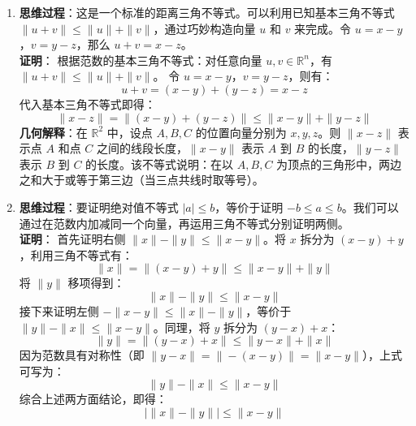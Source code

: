 \documentclass[lang=cn,11pt]{elegantbook}
\begin{document}
\begin{solution}
\begin{enumerate}
  \item[(1)] \textbf{思维过程}：这是一个标准的距离三角不等式。可以利用已知基本三角不等式 $\|u+v\| \leqslant  \|u\| + \|v\|$，通过巧妙构造向量 $u$ 和 $v$ 来完成。令 $u = x-y$，$v = y-z$，那么 $u+v = x-z$。\\
  \textbf{证明}：
  根据范数的基本三角不等式：对任意向量 $u, v \in \mathbb{R}^n$，有 $\|u+v\| \leqslant  \|u\| + \|v\|$。
  令 $u = x-y$，$v = y-z$，则有：
  \[
  u + v = (x-y) + (y-z) = x-z
  \]
  代入基本三角不等式即得：
  \[
  \|x-z\| = \|(x-y) + (y-z)\| \leqslant  \|x-y\| + \|y-z\|
  \]
  \textbf{几何解释}：在 $\mathbb{R}^2$ 中，设点 $A, B, C$ 的位置向量分别为 $x, y, z$。则 $\|x-z\|$ 表示点 $A$ 和点 $C$ 之间的线段长度，$\|x-y\|$ 表示 $A$ 到 $B$ 的长度，$\|y-z\|$ 表示 $B$ 到 $C$ 的长度。该不等式说明：在以 $A, B, C$ 为顶点的三角形中，两边之和大于或等于第三边（当三点共线时取等号）。

  \item[(2)] \textbf{思维过程}：要证明绝对值不等式 $|a| \leqslant  b$，等价于证明 $-b \leqslant  a \leqslant  b$。我们可以通过在范数内加减同一个向量，再运用三角不等式分别证明两侧。\\
  \textbf{证明}：
  首先证明右侧 $\|x\| - \|y\| \leqslant  \|x-y\|$。将 $x$ 拆分为 $(x-y) + y$，利用三角不等式有：
  \[
  \|x\| = \|(x-y) + y\| \leqslant  \|x-y\| + \|y\|
  \]
  将 $\|y\|$ 移项得到：
  \[
  \|x\| - \|y\| \leqslant  \|x-y\|
  \]
  接下来证明左侧 $-\|x-y\| \leqslant  \|x\| - \|y\|$，等价于 $\|y\| - \|x\| \leqslant  \|x-y\|$。同理，将 $y$ 拆分为 $(y-x) + x$：
  \[
  \|y\| = \|(y-x) + x\| \leqslant  \|y-x\| + \|x\|
  \]
  因为范数具有对称性（即 $\|y-x\| = \|-(x-y)\| = \|x-y\|$），上式可写为：
  \[
  \|y\| - \|x\| \leqslant  \|x-y\|
  \]
  综合上述两方面结论，即得：
  \[
  \bigl|\|x\| - \|y\|\bigr| \leqslant  \|x-y\|
  \]
\end{enumerate}
\end{solution}
\end{document}
